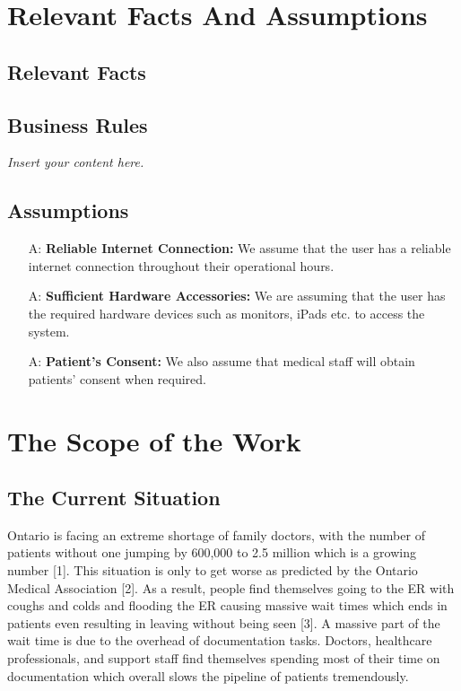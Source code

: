 \documentclass[12pt]{article}
\newcommand{\lips}{\textit{Insert your content here.}}
\newcounter{assumpnum} %
\begin{document}
\section{Relevant Facts And Assumptions}
\subsection{Relevant Facts}
\subsection{Business Rules}
\lips
\subsection{Assumptions}

\begin{itemize}
  \item[A\refstepcounter{assumpnum}\theassumpnum \label{A_reliableInternet}:] \textbf{Reliable Internet Connection:} We assume that the user has a reliable internet connection throughout their operational hours.
  \item[A\refstepcounter{assumpnum}\theassumpnum \label{A_sufficientHardware}:] \textbf{Sufficient Hardware Accessories:} We are assuming that the user has the required hardware devices such as monitors, iPads etc. to access the system.
  \item[A\refstepcounter{assumpnum}\theassumpnum \label{A_patientConsent}:] \textbf{Patient's Consent:} We also assume that medical staff will obtain patients' consent when required.  
\end{itemize}


\section{The Scope of the Work}

\subsection{The Current Situation}
Ontario is facing an extreme shortage of family doctors, with the number of patients without one jumping by 600,000 to 2.5 million which is a growing number [1]. This situation is only to get worse as predicted by the Ontario Medical Association [2]. As a result, people find themselves going to the ER with coughs and colds and flooding the ER causing massive wait times which ends in patients even resulting in leaving without being seen [3]. A massive part of the wait time is due to the overhead of documentation tasks. Doctors, healthcare professionals, and support staff find themselves spending most of their time on documentation which overall slows the pipeline of patients tremendously.
\end{document}
